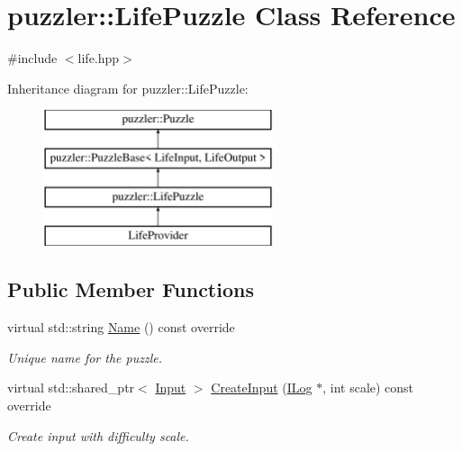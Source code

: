 \hypertarget{a00013}{}\section{puzzler\+:\+:Life\+Puzzle Class Reference}
\label{a00013}


{\ttfamily \#include $<$life.\+hpp$>$}

Inheritance diagram for puzzler\+:\+:Life\+Puzzle\+:\begin{figure}[H]
\begin{center}
\leavevmode
\includegraphics[height=4.000000cm]{a00013}
\end{center}
\end{figure}
\subsection*{Public Member Functions}
\begin{DoxyCompactItemize}
\item 
virtual std\+::string \hyperlink{a00013_a85c77863fbe9c92f44c3f6c6dfd182ea}{Name} () const override
\begin{DoxyCompactList}\small\item\em Unique name for the puzzle. \end{DoxyCompactList}\item 
virtual std\+::shared\+\_\+ptr$<$ \hyperlink{a00009}{Input} $>$ \hyperlink{a00013_a941f2fedd6f853ab29a38a63408a2d7a}{Create\+Input} (\hyperlink{a00008}{I\+Log} $\ast$, int scale) const override
\begin{DoxyCompactList}\small\item\em Create input with difficulty scale. \end{DoxyCompactList}\end{DoxyCompactItemize}
